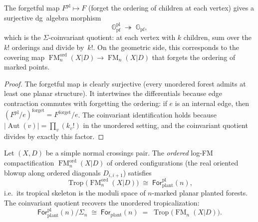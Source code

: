 \begin{proposition}
\label{prop:planar-forest-coinvariant}
The forgetful map $F^{\mathrm{pl}} \mapsto F$
(forget the ordering of children at each vertex) gives a surjective
dg~algebra morphism
\begin{equation}
\label{eq:planar-forest-coinvariant}
\mathbb{G}_{\mathrm{pf}}^{\mathrm{pl}}
\;\twoheadrightarrow\;
\mathbb{G}_{\mathrm{pf}},
\end{equation}
which is the $\Sigma$-coinvariant quotient: at each vertex with
$k$ children, sum over the $k!$ orderings and divide by~$k!$.
On the geometric side, this corresponds to the covering map
$\operatorname{FM}_n^{\mathrm{ord}}(X|D) \to
\operatorname{FM}_n(X|D)$
that forgets the ordering of marked points.
\end{proposition}

\begin{proof}
The forgetful map is clearly surjective (every unordered forest
admits at least one planar structure).  It intertwines the
differentials because edge contraction commutes with forgetting
the ordering: if $e$ is an internal edge, then
$(F^{\mathrm{pl}}/e)^{\mathrm{forget}}
= F^{\mathrm{forget}}/e$.
The coinvariant identification holds because
$|\operatorname{Aut}(v)| = \prod_{v} (k_v!)$ in the unordered
setting, and the coinvariant quotient divides by exactly this
factor.
\end{proof}

\begin{theorem}
\label{thm:planar-forest-tropicalization}
Let $(X,D)$ be a simple normal crossings pair.  The \emph{ordered}
log-FM compactification\label{constr:ordered-fm}
$\operatorname{FM}_n^{\mathrm{ord}}(X|D)$ of ordered configurations
\textup{(}the real oriented blowup along ordered diagonals
$D_{i,i+1}$\textup{)} satisfies
\[
\operatorname{Trop}\bigl(
\operatorname{FM}_n^{\mathrm{ord}}(X|D)
\bigr)
\;\cong\;
\mathsf{For}_{\mathrm{plant}}^{\mathrm{pl}}(n),
\]
i.e.\ its tropical skeleton is the moduli space of $n$-marked
planar planted forests.  The coinvariant quotient recovers the
unordered tropicalization:
\[
\mathsf{For}_{\mathrm{plant}}^{\mathrm{pl}}(n) / \Sigma_n
\;\cong\;
\mathsf{For}_{\mathrm{plant}}(n)
\;=\;
\operatorname{Trop}\bigl(
\operatorname{FM}_n(X|D)
\bigr).
\]
\end{theorem}

